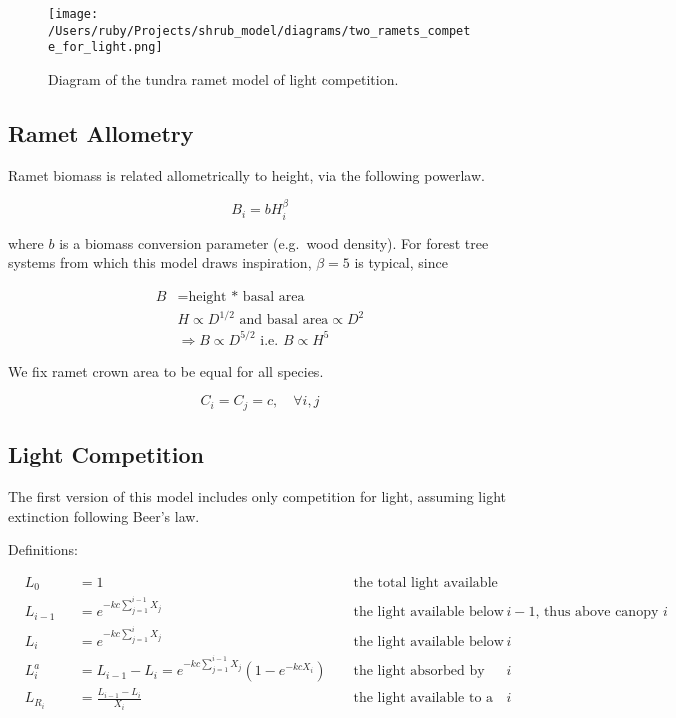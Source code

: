 \documentclass[
]{article}
\begin{document}
\begin{figure}
\centering
\texttt{[image: /Users/ruby/Projects/shrub\_model/diagrams/two\_ramets\_compete\_for\_light.png]}
\caption{Diagram of the tundra ramet model of light competition.}
\end{figure}

\subsection{Ramet Allometry}\label{ramet-allometry}

Ramet biomass is related allometrically to height, via the following
powerlaw.

\[ B_i = b H_i^\beta \]

where \(b\) is a biomass conversion parameter (e.g.~wood density). For
forest tree systems from which this model draws inspiration,
\(\beta = 5\) is typical, since

\begin{align}
  B &= \text{height * basal area} \\
  & H \propto D^{1/2} \text{ and } \text{basal area} \propto D^2 \\
  & \Rightarrow B \propto D^{5/2} \text{ i.e. } B \propto H^5
\end{align}

We fix ramet crown area to be equal for all species.

\[ C_i = C_j = c, \quad \forall i,j \]

\subsection{Light Competition}\label{light-competition}

The first version of this model includes only competition for light,
assuming light extinction following Beer's law.

Definitions:

\begin{align}
& L_0 &&= 1 && \text { the total light available above the canopy of all species} \\
& L_{i-1} &&= e^{-kc\sum_{j=1}^{i-1}X_j} && \text{ the light available below canopy $i-1$, thus above canopy $i$} \\
& L_{i} &&= e^{-kc\sum_{j=1}^{i}X_j} && \text{ the light available below canopy $i$ } \\
& L_{i}^a && = L_{i-1} - L_{i}  = e^{-kc\sum_{j=1}^{i-1}X_j} (1-e^{-kcX_i}) && \text{ the light absorbed by species $i$} \\
& L_{R_i} &&= \frac{L_{i-1} - L_{i}}{X_i} && \text{ the light available to a single ramet of species } i \\
\end{align}
\end{document}
